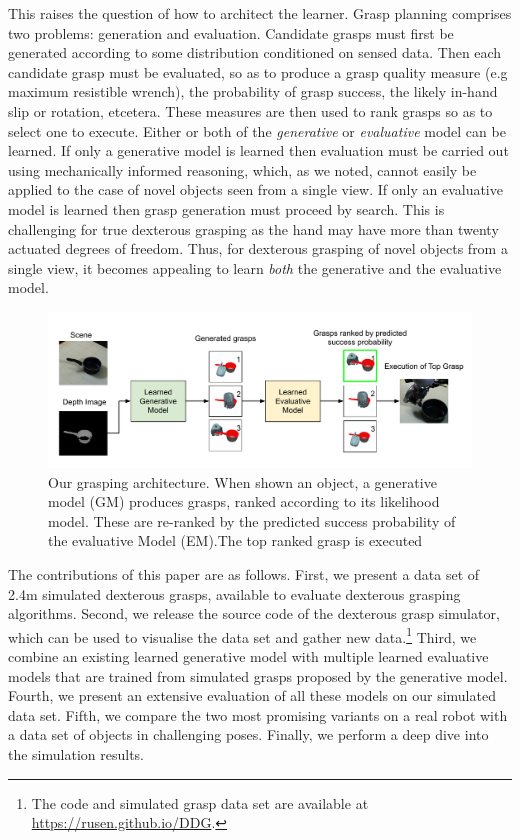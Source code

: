 This raises the question of how to architect the learner. Grasp planning comprises two problems: generation and evaluation. Candidate grasps must first be generated according to some distribution conditioned on sensed data. Then each candidate grasp must be evaluated, so as to produce a grasp quality measure (e.g maximum resistible wrench), the probability of grasp success, the likely in-hand slip or rotation, etcetera. These measures are then used to rank grasps so as to select one to execute. Either or both of the {\em generative} or {\em evaluative} model can be learned. If only a generative model is learned then evaluation must be carried out using mechanically informed reasoning, which, as we noted, cannot easily be applied to the case of novel objects seen from a single view. If only an evaluative model is learned then grasp generation must proceed by search. This is challenging for true dexterous grasping as the hand may have more than twenty actuated degrees of freedom. Thus, for dexterous grasping of novel objects from a single view, it becomes appealing to learn {\em both} the generative and the evaluative model. 
\begin{figure}[t]
\begin{center}
  \includegraphics[width=\columnwidth]{images/GEAarchitecture.pdf}
  \end{center}
  \caption{Our grasping architecture. When shown an object, a generative model (GM) produces grasps, ranked according to its likelihood model. These are re-ranked by the predicted success probability of the evaluative Model (EM).The top ranked grasp is executed \label{fig:systemArchitecture}}
\end{figure}

The contributions of this paper are as follows. First, we present a data set of 2.4m simulated dexterous grasps, available to evaluate dexterous grasping algorithms. Second, we release the source code of the dexterous grasp simulator, which can be used to visualise the data set and gather new data.\footnote{The code and simulated grasp data set are available at \href{https://rusen.github.io/DDG}{https://rusen.github.io/DDG}.} Third, we combine an existing learned generative model with multiple learned evaluative models that are trained from simulated grasps proposed by the generative model. Fourth, we present an extensive evaluation of all these models on our simulated data set. Fifth, we compare the two most promising variants on a real robot with a data set of objects in challenging poses. Finally, we perform a deep dive into the simulation results.

